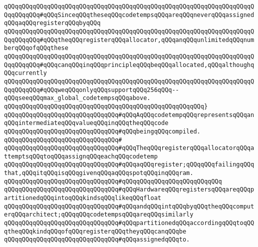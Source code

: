 \verb|qQQqqQQqqQQqqQQqqQQqqQQqqQQqqQQqqQQqqQQqqQQqqQQqqQQqqQQqqQQqqQQqqQQqqQQqqQQqqQQq#qQQqSinceqQQqtheseqQQqcodetempsqQQqareqQQqneverqQQqassignedqQQqaqQQqregisterqQQqbyqQQq|\newline
\verb|qQQqqQQqqQQqqQQqqQQqqQQqqQQqqQQqqQQqqQQqqQQqqQQqqQQqqQQqqQQqqQQqqQQqqQQqqQQqqQQq#qQQqtheqQQqregisterqQQqallocator,qQQqanqQQqunlimitedqQQqnumberqQQqofqQQqthese|\newline
\verb|qQQqqQQqqQQqqQQqqQQqqQQqqQQqqQQqqQQqqQQqqQQqqQQqqQQqqQQqqQQqqQQqqQQqqQQqqQQqqQQq#qQQqcanqQQqinqQQqprincipleqQQqbeqQQqallocated,qQQqalthoughqQQqcurrently|\newline
\verb|qQQqqQQqqQQqqQQqqQQqqQQqqQQqqQQqqQQqqQQqqQQqqQQqqQQqqQQqqQQqqQQqqQQqqQQqqQQqqQQq#qQQqweqQQqonlyqQQqsupportqQQq256qQQq--qQQqseeqQQqmax_global_codetempsqQQqabove.|\newline
\verb|qQQqqQQqqQQqqQQqqQQqqQQqqQQqqQQqqQQqqQQqqQQqqQQqqQQqqQQq}|\newline
\newline
\newline
\newline
\newline
\verb|qQQqqQQqqQQqqQQqqQQqqQQqqQQqqQQq#qQQqAqQQqcodetempqQQqrepresentsqQQqanqQQqintermediateqQQqvalueqQQqinqQQqtheqQQqcode|\newline
\verb|qQQqqQQqqQQqqQQqqQQqqQQqqQQqqQQq#qQQqbeingqQQqcompiled.|\newline
\verb|qQQqqQQqqQQqqQQqqQQqqQQqqQQqqQQq#|\newline
\verb|qQQqqQQqqQQqqQQqqQQqqQQqqQQqqQQq#qQQqTheqQQqregisterqQQqallocatorqQQqattemptsqQQqtoqQQqassignqQQqeachqQQqcodetemp|\newline
\verb|qQQqqQQqqQQqqQQqqQQqqQQqqQQqqQQq#qQQqaqQQqregister;qQQqqQQqfailingqQQqthat,qQQqitqQQqisqQQqgivenqQQqaqQQqspotqQQqinqQQqram.|\newline
\verb|qQQqqQQqqQQqqQQqqQQqqQQqqQQqqQQq#qQQqqQQqqQQqqQQqqQQqqQQqqQQq|\newline
\verb|qQQqqQQqqQQqqQQqqQQqqQQqqQQqqQQq#qQQqHardwareqQQqregistersqQQqareqQQqpartitionedqQQqintoqQQqkindsqQQqlikeqQQqfloat|\newline
\verb|qQQqqQQqqQQqqQQqqQQqqQQqqQQqqQQq#qQQqandqQQqintqQQqbyqQQqtheqQQqcomputerqQQqarchitect;qQQqqQQqcodetempsqQQqareqQQqsimilarly|\newline
\verb|qQQqqQQqqQQqqQQqqQQqqQQqqQQqqQQq#qQQqpartitionedqQQqaccordingqQQqtoqQQqtheqQQqkindqQQqofqQQqregisterqQQqtheyqQQqcanqQQqbe|\newline
\verb|qQQqqQQqqQQqqQQqqQQqqQQqqQQqqQQq#qQQqassignedqQQqto.|\newline
